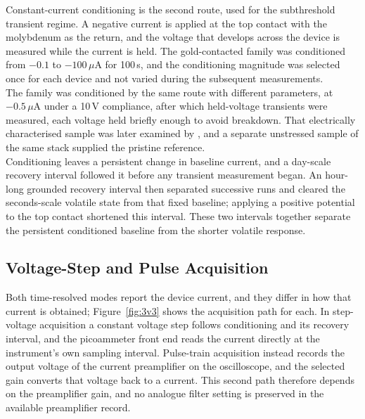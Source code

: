 \noindent Constant-current conditioning is the second route, used for the subthreshold transient regime. A
negative current is applied at the top contact with the molybdenum as the return, and the voltage that develops
across the device is measured while the current is held. The gold-contacted family was conditioned from $-0.1$ to
$-100\,\mu$A for 100\,s, and the conditioning magnitude was selected once for each device and not varied during the
subsequent measurements.\\

\noindent The  family was conditioned by the same route with different parameters, at
$-0.5\,\mu$A under a 10\,V compliance, after which held-voltage transients were measured, each voltage held
briefly enough to avoid breakdown. That electrically characterised sample was later examined by , and a
separate unstressed sample of the same stack supplied the pristine reference.\\

\noindent Conditioning leaves a persistent change in baseline current, and a day-scale recovery interval followed it
before any transient measurement began. An hour-long grounded recovery interval then separated successive runs and
cleared the seconds-scale volatile state from that fixed baseline; applying a positive potential to the top contact
shortened this interval. These two intervals together separate the persistent conditioned baseline from the shorter
volatile response.

\FloatBarrier
\subsection[Voltage-Step and Pulse Acquisition]{Voltage-Step and Pulse Acquisition}\label{sec:3pulse}

\noindent Both time-resolved modes report the device current, and they differ in how that current is obtained;
Figure~\ref{fig:3v3} shows the acquisition path for each. In step-voltage acquisition a constant voltage step follows
conditioning and its recovery interval, and the picoammeter front end reads the current directly at the instrument's
own sampling interval. Pulse-train acquisition instead records the output voltage of the current preamplifier on the
oscilloscope, and the selected gain converts that voltage back to a current. This second path therefore depends on the
preamplifier gain, and no analogue filter setting is preserved in the available preamplifier record.\\

